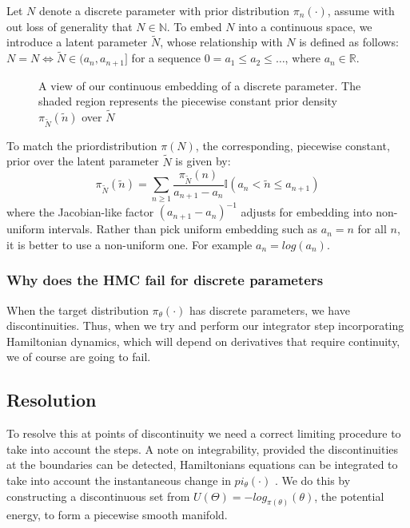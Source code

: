 \documentclass[]{report}
\begin{document}
Let $N$ denote a discrete parameter with prior distribution $\pi_{n}(\cdot)$, assume with out loss of generality that $N \in \mathbb{N}$. To embed $N$ into a continuous space, we introduce
a latent parameter $\tilde{N}$, whose relationship with $N$ is defined as follows: $N = N \iff \tilde{N}\in(a_{n}, a_{n+1}] $ for a sequence $0 = a_{1} \leq a_{2} \leq \ldots$, where $a_{n} \in \mathbb{R}$. \\
\begin{figure}[h!]
	\centering
{}
\caption{A view of our continuous embedding of a discrete parameter. The shaded region represents the piecewise constant prior density $\pi_{\tilde{N}}(\tilde{n})$ over $\tilde{N}$}\label{fig:contembedding}
\end{figure}
To match the priordistribution $\pi(N)$, the corresponding, piecewise constant, prior over the latent parameter $\tilde{N}$ is given by: \begin{equation}
\pi_{\tilde{N}}(\tilde{n}) = \sum_{n \geq 1} \frac{\pi_{\tilde{N}}(n)}{a_{n+1} - a_{n}} \mathbb{I}(a_{n} < \tilde{n} \leq a_{n+1}) 
\end{equation}
where the Jacobian-like factor $(a_{n+1} - a_{n})^{-1}$ adjusts for embedding into non-uniform intervals. Rather than pick uniform embedding such as $a_{n} = n$ for all $n$, it is better to use a non-uniform one. For example $a_{n} = log(a_{n})$.

\subsubsection{Why does the HMC fail for discrete parameters}
When the target distribution $\pi_{\theta}(\cdot)$ has discrete parameters, we have discontinuities. Thus, when we try and perform our integrator step incorporating Hamiltonian dynamics, 
which will depend on derivatives that require continuity, we of course are going to fail.

\subsection{Resolution}
To resolve this at points of discontinuity we need a correct limiting procedure to take into account the steps. A note on integrability, provided the discontinuities at the boundaries can be detected, Hamiltonians equations can be integrated to take into account the instantaneous change in $pi_{\theta}(\cdot)$ . We do this by constructing a discontinuous set from $U(\Theta) = -log_{\pi(\theta)}(\theta)$, the potential energy, to form a piecewise smooth manifold.\\
\end{document}
